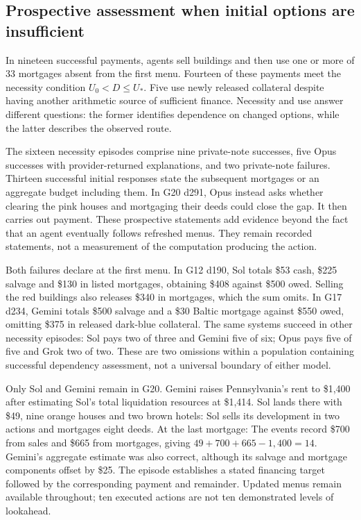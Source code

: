 \subsection{Prospective assessment when initial options are insufficient}
In nineteen successful payments, agents sell buildings and then use one or more of 33 mortgages absent from the first menu. Fourteen of these payments meet the necessity condition $U_0<D\leq U_*$. Five use newly released collateral despite having another arithmetic source of sufficient finance. Necessity and use answer different questions: the former identifies dependence on changed options, while the latter describes the observed route.

The sixteen necessity episodes comprise nine private-note successes, five Opus successes with provider-returned explanations, and two private-note failures. Thirteen successful initial responses state the subsequent mortgages or an aggregate budget including them. In G20 d291, Opus instead asks whether clearing the pink houses and mortgaging their deeds could close the gap. It then carries out payment. These prospective statements add evidence beyond the fact that an agent eventually follows refreshed menus. They remain recorded statements, not a measurement of the computation producing the action.

Both failures declare at the first menu. In G12 d190, Sol totals \$53 cash, \$225 salvage and \$130 in listed mortgages, obtaining \$408 against \$500 owed. Selling the red buildings also releases \$340 in mortgages, which the sum omits. In G17 d234, Gemini totals \$500 salvage and a \$30 Baltic mortgage against \$550 owed, omitting \$375 in released dark-blue collateral. The same systems succeed in other necessity episodes: Sol pays two of three and Gemini five of six; Opus pays five of five and Grok two of two. These are two omissions within a population containing successful dependency assessment, not a universal boundary of either model.

Only Sol and Gemini remain in G20. Gemini raises Pennsylvania's rent to \$1,400 after estimating Sol's total liquidation resources at \$1,414. Sol lands there with \$49, nine orange houses and two brown hotels:
Sol sells its development in two actions and mortgages eight deeds. At the last mortgage:
The events record \$700 from sales and \$665 from mortgages, giving $49+700+665-1,400=14$. Gemini's aggregate estimate was also correct, although its salvage and mortgage components offset by \$25. The episode establishes a stated financing target followed by the corresponding payment and remainder. Updated menus remain available throughout; ten executed actions are not ten demonstrated levels of lookahead.

